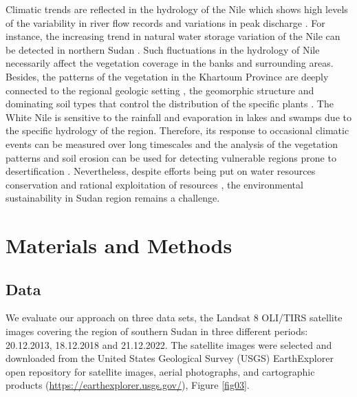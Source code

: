 \documentclass[jimaging,article,submit,pdftex,moreauthors]{Definitions/mdpi}
\begin{document}
Climatic trends are reflected in the hydrology of the Nile which shows high levels of the variability in river flow records \cite{CONWAY200599} and variations in peak discharge \cite{Babiker}. For instance, the increasing trend in natural water storage variation of the Nile can be detected in northern Sudan \cite{ABDELMALIK2019103596}. Such fluctuations in the hydrology of Nile necessarily affect the vegetation coverage in the banks and surrounding areas. Besides, the patterns of the vegetation in the Khartoum Province are deeply connected to the regional geologic setting \cite{ELSHEIKH201182}, the geomorphic structure and dominating soil types that control the distribution of the specific plants \cite{Mahmoud}. The White Nile is sensitive to the rainfall and evaporation in lakes and swamps due to the specific hydrology of the region. Therefore, its response to occasional climatic events can be measured over long timescales \cite{Sene} and the analysis of the vegetation patterns and soil erosion can be used for detecting vulnerable regions prone to desertification \cite{Bakhit}. Nevertheless, despite efforts being put on water resources conservation and rational exploitation of resources \cite{MOHAMEDALI2003237,w10111579}, the environmental sustainability in Sudan region remains a challenge.

 

\section{Materials and Methods}

\subsection{Data}

We evaluate our approach on three data sets, the Landsat 8 OLI/TIRS satellite images covering the region of southern Sudan in three different periods: 20.12.2013, 18.12.2018 and 21.12.2022. The satellite images were selected and downloaded from the United States Geological Survey (USGS) EarthExplorer open repository for satellite images, aerial photographs, and cartographic products (\href{https://earthexplorer.usgs.gov/}{https://earthexplorer.usgs.gov/}), Figure \ref{fig03}.
\end{document}

